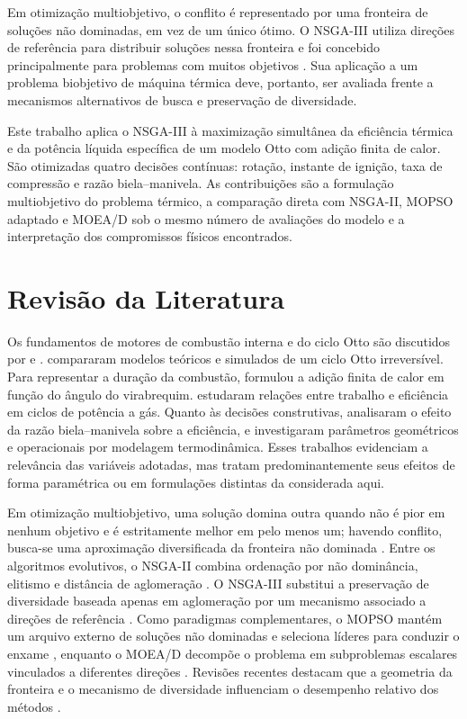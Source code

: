 \documentclass[a4paper,11pt]{article}
\begin{document}
Em otimização multiobjetivo, o conflito é representado por uma fronteira de
soluções não dominadas, em vez de um único ótimo. O NSGA-III utiliza direções de
referência para distribuir soluções nessa fronteira e foi concebido
principalmente para problemas com muitos objetivos \citep{deb2014nsga3}. Sua
aplicação a um problema biobjetivo de máquina térmica deve, portanto, ser
avaliada frente a mecanismos alternativos de busca e preservação de
diversidade.

Este trabalho aplica o NSGA-III à maximização simultânea da eficiência térmica e
da potência líquida específica de um modelo Otto com adição finita de calor.
São otimizadas quatro decisões contínuas: rotação, instante de ignição, taxa de
compressão e razão biela--manivela. As contribuições são a formulação
multiobjetivo do problema térmico, a comparação direta com NSGA-II, MOPSO
adaptado e MOEA/D sob o mesmo número de avaliações do modelo e a interpretação
dos compromissos físicos encontrados.

\section{Revisão da Literatura}\label{sec:revisao}

Os fundamentos de motores de combustão interna e do ciclo Otto são discutidos
por \citet{heywood2018} e \citet{pulkrabek2004}. \citet{curto2008} compararam
modelos teóricos e simulados de um ciclo Otto irreversível. Para representar a
duração da combustão, \citet{naaktgeboren2017} formulou a adição finita de
calor em função do ângulo do virabrequim. \citet{he2021} estudaram relações
entre trabalho e eficiência em ciclos de potência a gás. Quanto às decisões construtivas,
\citet{suzuki2006rod} analisaram o efeito da razão biela--manivela sobre a
eficiência, e \citet{shah2022producer} investigaram parâmetros geométricos e
operacionais por modelagem termodinâmica. Esses trabalhos evidenciam a
relevância das variáveis adotadas, mas tratam predominantemente seus efeitos de
forma paramétrica ou em formulações distintas da considerada aqui.

Em otimização multiobjetivo, uma solução domina outra quando não é pior em
nenhum objetivo e é estritamente melhor em pelo menos um; havendo conflito,
busca-se uma aproximação diversificada da fronteira não dominada
\citep{deb2011}. Entre os algoritmos evolutivos, o NSGA-II combina ordenação por
não dominância, elitismo e distância de aglomeração \citep{deb2002}. O NSGA-III
substitui a preservação de diversidade baseada apenas em aglomeração por um
mecanismo associado a direções de referência \citep{deb2014nsga3}. Como
paradigmas complementares, o MOPSO mantém um arquivo externo de soluções não
dominadas e seleciona líderes para conduzir o enxame
\citep{coello2002mopso,coello2004mopso}, enquanto o MOEA/D decompõe o problema
em subproblemas escalares vinculados a diferentes direções
\citep{zhang2007moead}. Revisões recentes destacam que a geometria da fronteira
e o mecanismo de diversidade influenciam o desempenho relativo dos métodos
\citep{hua2021survey}.
\end{document}
